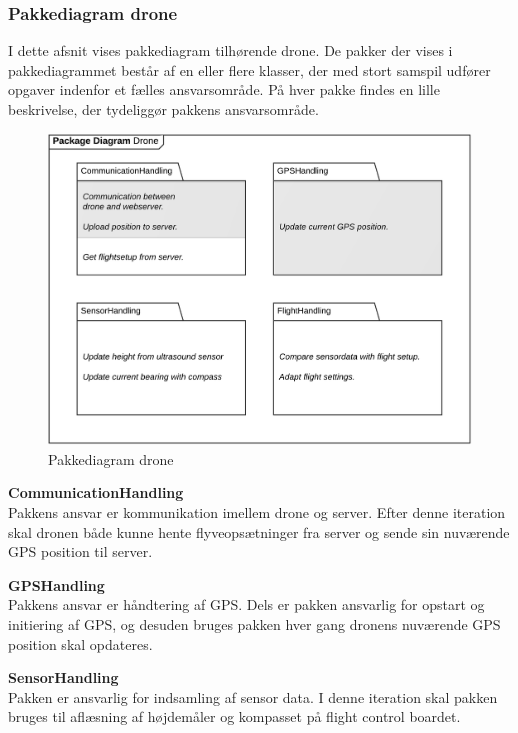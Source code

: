 \newpage
\subsubsection*{Pakkediagram drone}
I dette afsnit vises pakkediagram tilhørende drone. De pakker der vises i pakkediagrammet består af en eller flere klasser, der med stort samspil udfører opgaver indenfor et fælles ansvarsområde. På hver pakke findes en lille beskrivelse, der tydeliggør pakkens ansvarsområde. 

\begin{figure}[H]
	\centering
	\includegraphics[width=1\textwidth]{Billeder/pakke_diagrammer/iteration2_drone.png}
	\vspace{-0.5cm}
	\caption{Pakkediagram drone}
	\label{fig:iteration2_pakke_diagram_drone}
\end{figure}

\textbf{CommunicationHandling}\\
Pakkens ansvar er kommunikation imellem drone og server. Efter denne iteration skal dronen både kunne hente flyveopsætninger fra server og sende sin nuværende GPS position til server.

\textbf{GPSHandling}\\
Pakkens ansvar er håndtering af GPS. Dels er pakken ansvarlig for opstart og initiering af GPS, og desuden bruges pakken hver gang dronens nuværende GPS position skal opdateres.

\textbf{SensorHandling}\\
Pakken er ansvarlig for indsamling af sensor data. I denne iteration skal pakken bruges til aflæsning af højdemåler og kompasset på flight control boardet. 

